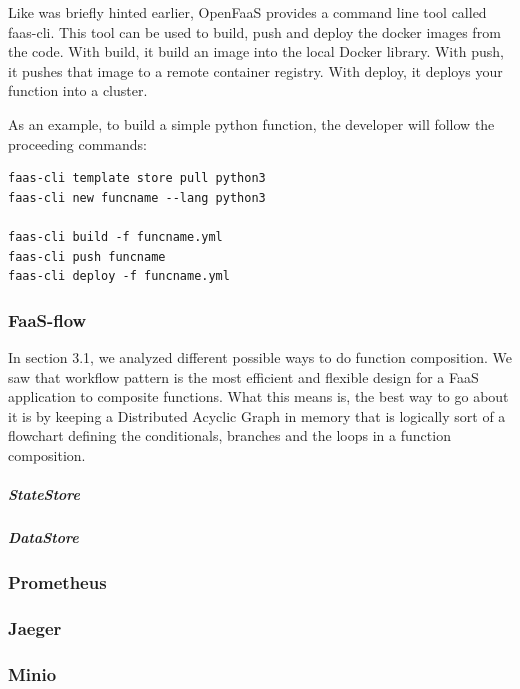 \documentclass[12pt,titlepage]{article}
\begin{document}
Like was briefly hinted earlier, OpenFaaS provides a command line tool called
faas-cli. This tool can be used to build, push and deploy the docker images from
the code. With build, it build an image into the local Docker library. With
push, it pushes that image to a remote container registry. With deploy, it
deploys your function into a cluster.

As an example, to build a simple python function, the developer will follow the
proceeding commands:

\begin{lstlisting}
faas-cli template store pull python3
faas-cli new funcname --lang python3

faas-cli build -f funcname.yml
faas-cli push funcname
faas-cli deploy -f funcname.yml
\end{lstlisting}

\subsubsection{FaaS-flow}
\label{sec:org1fd55ff}
In section 3.1, we analyzed different possible ways to do function composition.
We saw that workflow pattern is the most efficient and flexible design for a
FaaS application to composite functions. What this means is, the best way to go
about it is by keeping a Distributed Acyclic Graph in memory that is logically
sort of a flowchart defining the conditionals, branches and the loops in a
function composition.  
\subparagraph{StateStore}
\label{sec:org9d27ef1}
\subparagraph{DataStore}
\label{sec:org3896e5c}

\subsubsection{Prometheus}
\label{sec:org87954e1}
\subsubsection{Jaeger}
\label{sec:org1e88540}
\subsubsection{Minio}
\label{sec:org630a7de}
\end{document}
